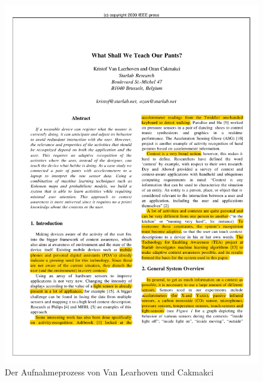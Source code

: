 \begin{figure}
\centering
\includegraphics[clip,trim=25mm 90mm 110mm 115mm, page=6, scale=1]{img/VanLaerhoven2000}
\caption{Der Aufnahmeprozess von Van Learhoven und Cakmakci \cite{VanLaerhoven2000}}
\label{fig:van-laerhoven-experiment}
\end{figure}

